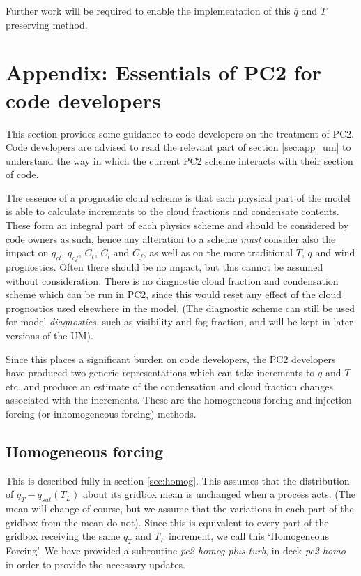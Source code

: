 \documentclass{UMDP_article}
\begin{document}
Further work will be required to enable the implementation of
this $\overline{q}$
and $\overline{T}$ preserving method.

\section{Appendix: Essentials of PC2 for code developers}
\label{sec:code-development}
This section provides some guidance to code developers on the treatment
of PC2. Code developers are advised to read the relevant part of section
\ref{sec:app_um} to understand the way in which the current PC2 scheme
interacts with their section of code.

The essence of a prognostic cloud scheme is that each physical part of the
model is able to calculate increments to the cloud fractions and condensate
contents. These form an integral part of each physics scheme and should be
considered by code owners as such, hence any alteration to a scheme
\textit{must} consider also the impact on $q_{cl}$, $q_{cf}$, $C_t$,
$C_l$ and $C_f$, as
well as on the more traditional $T$, $q$ and wind prognostics. Often
there should be no impact, but this cannot be assumed without consideration.
There is no diagnostic cloud fraction and condensation scheme which can be
run in PC2, since this would reset any effect of the cloud prognostics used
elsewhere in the model. (The diagnostic scheme can still be used for model
\textit{diagnostics}, such as visibility and fog fraction, and will be
kept in later versions of the UM).

Since this places a significant burden on code developers, the PC2
developers have produced two generic representations which can take increments
to $q$ and $T$ etc. and produce an estimate of the condensation and
cloud fraction changes associated with the increments. These are the
homogeneous forcing and injection forcing (or inhomogeneous forcing)
methods.

\subsection{Homogeneous forcing}
This is described fully in section \ref{sec:homog}. This assumes that the
distribution of $q_T - q_{sat}(T_L)$ about its gridbox mean is unchanged when
a process acts. (The mean will change of course, but we assume that the
variations in each part of the gridbox from the mean do not). Since this
is equivalent to every part of the gridbox receiving the same $q_T$ and $T_L$
increment, we call this `Homogeneous Forcing'. We have provided a subroutine
\textit{pc2-homog-plus-turb}, in deck \textit{pc2-homo} in order to
provide the necessary updates.
\end{document}

